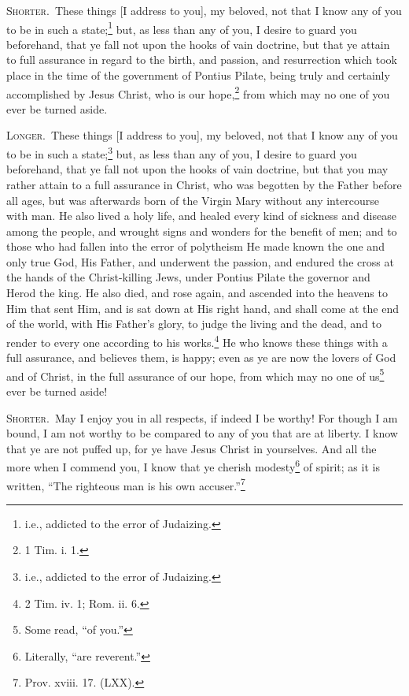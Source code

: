 
\textsc{Shorter.}~These things [I address to you], my beloved, not that I know any of you to be in such a state;\footnote{i.e., addicted to the error of Judaizing.} but, as less than any of you, I desire to guard you beforehand, that ye fall not upon the hooks of vain doctrine, but that  ye attain to full assurance in regard to the birth, and passion, and resurrection which took place in the time of the government of Pontius Pilate, being truly and certainly accomplished by Jesus Christ, who is our hope,\footnote{1 Tim. i. 1.} from which may no one of you ever be turned aside.

\textsc{Longer.}~These things [I address to you], my beloved, not that I know any of you to be in such a state;\footnote{i.e., addicted to the error of Judaizing.} but, as less than any of you, I desire to guard you beforehand, that ye fall not upon the hooks of vain doctrine, but that you may rather attain to a full assurance in Christ, who was begotten by the Father before all ages, but was afterwards born of the Virgin Mary without any intercourse with man. He also lived a holy life, and healed every kind of sickness and disease among the people, and wrought signs and wonders for the benefit of men; and to those who had fallen into the error of polytheism He made known the one and only true God, His Father, and underwent the passion, and endured the cross at the hands of the Christ-killing Jews, under Pontius Pilate the governor and Herod the king. He also died, and rose again, and ascended into the heavens to Him that sent Him, and is sat down at His right hand, and shall come at the end of the world, with His Father’s glory, to judge the living and the dead, and to render to every one according to his works.\footnote{2 Tim. iv. 1; Rom. ii. 6.} He who knows these things with a full assurance, and believes them, is happy; even as ye are now the lovers of God and of Christ, in the full assurance of our hope, from which may no one of us\footnote{Some read, “of you.”} ever be turned aside!


\textsc{Shorter.}~May I enjoy you in all respects, if indeed I be worthy! For though I am bound, I am not worthy to be compared to any of you that are at liberty. I know that ye are not puffed up, for ye have Jesus Christ in yourselves. And all the more when I commend you, I know that ye cherish modesty\footnote{Literally, “are reverent.”} of spirit; as it is written, “The righteous man is his own accuser.”\footnote{Prov. xviii. 17. (LXX).}

